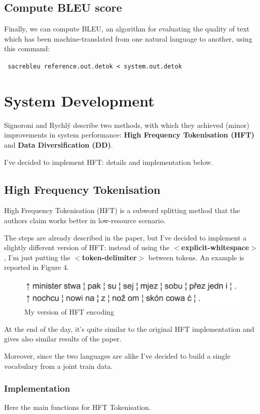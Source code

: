 \documentclass[12pt]{article}
\begin{document}
\subsection{Compute BLEU score}
Finally, we can compute BLEU, an algorithm for evaluating the quality of text which has been machine-translated from one natural language to another, using this command:

\vspace{0.2cm}
\texttt{
sacrebleu reference.out.detok < system.out.detok
}

\section{System Development}
Signoroni and Rychlý describe two methods, with which they achieved (minor) improvements in system performance: \textbf{High Frequency Tokenisation (HFT)} and \textbf{Data Diversification (DD)}.

I've decided to implement HFT: details and implementation below.

\subsection{High Frequency Tokenisation}
High Frequency Tokenisation (HFT) is a subword splitting method that the authors claim works better in low-resource scenario. 

The steps are already described in the paper, but I've decided to implement a slightly different version of HFT:
instead of using the \textbf{$<$explicit-whitespace$>$}, I'm just putting the \textbf{$<$token-delimiter$>$} between tokens. 
An example is reported in Figure 4.

\begin{figure}
    \centering
    \includegraphics[width=0.7\linewidth]{report/figures/hft_example.png}
    \caption{My version of HFT encoding}
    \label{fig:hft_example}
\end{figure}


At the end of the day, it's quite similar to the original HFT implementation and gives also similar results of the paper. 

Moreover, since the two languages are alike I've decided to build a single vocabulary from a joint train data.

\subsubsection{Implementation}
Here the main functions for HFT Tokenisation.
\end{document}
